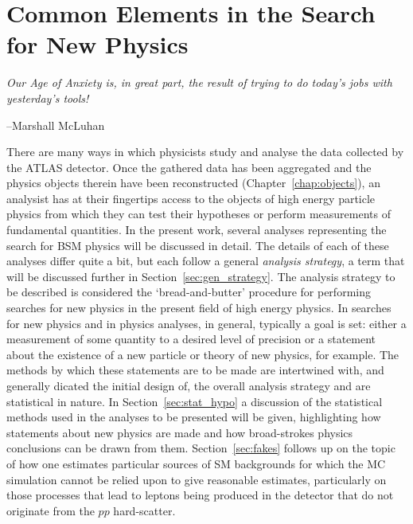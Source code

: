 \chapter{Common Elements in the Search for New Physics}
\label{chap:common_search}

\epigraph{
\textit{Our Age of Anxiety is, in great part, the result of trying to do today's jobs with yesterday's tools!}
}{--Marshall McLuhan}


There are many ways in which physicists study and analyse the data collected by
the ATLAS detector.
Once the gathered data has been aggregated and the physics objects therein
have been reconstructed (Chapter~\ref{chap:objects}), an analysist has at their fingertips access
to the objects of high energy particle physics from which they
can test their hypotheses or perform measurements of fundamental quantities.
In the present work, several analyses representing the search for BSM physics
will be discussed in detail.
The details of each of these analyses differ quite a bit, but each follow
a general \textit{analysis strategy}, a term that will be discussed
further in Section~\ref{sec:gen_strategy}.
The analysis strategy to be described is considered the `bread-and-butter' procedure
for performing searches for new physics in the present field of high energy physics.
In searches for new physics and in physics analyses, in general, typically
a goal is set: either a measurement of some quantity to a desired level of precision
or a statement about the existence of a new particle or theory of new physics, for example.
The methods by which these statements are to be made are intertwined with, and generally
dicated the initial design of, the overall
analysis strategy and are statistical in nature.
In Section~\ref{sec:stat_hypo} a discussion of the statistical methods used
in the analyses to be presented will be given, highlighting how statements about
new physics are made and how broad-strokes physics conclusions can be drawn from them.
Section~\ref{sec:fakes} follows up on the topic of how one estimates particular sources
of SM backgrounds for which the MC simulation cannot be relied upon to give reasonable
estimates, particularly on those processes that lead to leptons being produced in the detector
that do not originate from the $pp$ hard-scatter.


